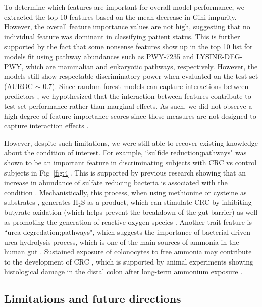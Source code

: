 \documentclass[10pt,letterpaper]{article}
\begin{document}
To determine which features are important for overall model performance, we extracted the top 10 features based on the mean decrease in Gini impurity. However, the overall feature importance values are not high, suggesting that no individual feature was dominant in classifying patient status. This is further supported by the fact that some nonsense features show up in the top 10 list for models fit using pathway abundances such as PWY-7235 and LYSINE-DEG-PWY, which are mammalian and eukaryotic pathways, respectively. However, the models still show respectable discriminatory power when evaluated on the test set (AUROC $\sim$ 0.7). Since random forest models can capture interactions between predictors \cite{hastie2009elements}, we hypothesized that the interaction between features contribute to test set performance rather than marginal effects. As such, we did not observe a high degree of feature importance scores since these measures are not designed to capture interaction effects \cite{wright2016little}. 

However, despite such limitations, we were still able to recover existing knowledge about the condition of interest. For example, ``sulfide reduction;pathways" was shown to be an important feature in discriminating subjects with CRC vs control subjects in Fig~\ref{fig:4}. This is supported by previous research showing that an increase in abundance of sulfate reducing bacteria is associated with the condition \cite{yachida2019metagenomic}. Mechanistically, this process, when using methionine or cysteine as substrates \cite{cheng2020intestinal}, generates H$_2$S as a product, which can stimulate CRC by inhibiting butyrate oxidation (which helps prevent the breakdown of the gut barrier) as well as promoting the generation of reactive oxygen species \cite{marquet2009lactate}. Another trait feature is ``urea degredation;pathways", which suggests the importance of bacterial-driven urea hydrolysis process, which is one of the main sources of ammonia in the human gut \cite{blachier2007effects}. Sustained exposure of colonocytes to free ammonia may contribute to the development of CRC \cite{clausen1992fecal}, which is supported by animal experiments showing histological damage in the distal colon after long-term ammonium exposure \cite{lin1991colon}.      
\subsection*{Limitations and future directions}
\end{document}
